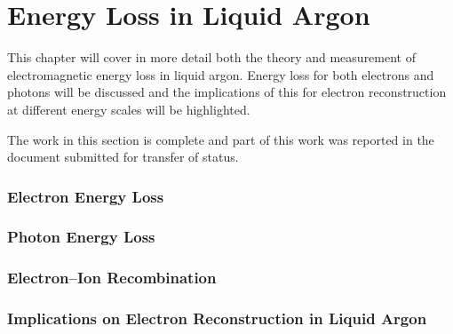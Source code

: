 \chapter{\label{ch:4-energyloss}Energy Loss in Liquid Argon} 

\minitoc

This chapter will cover in more detail both the theory and measurement of
electromagnetic energy loss in liquid argon. Energy loss for both electrons and
photons will be discussed and the implications of this for electron
reconstruction at different energy scales will be highlighted. 

The work in this section is complete and part of this work was reported in the
document submitted for transfer of status.

\subsection{Electron Energy Loss}
\subsection{Photon Energy Loss}
\subsection{Electron--Ion Recombination}
\subsection{Implications on Electron Reconstruction in Liquid Argon}
